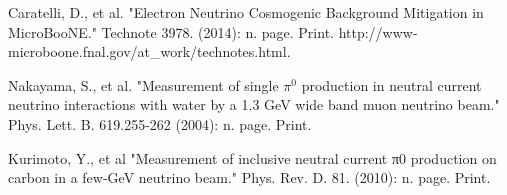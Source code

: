 \documentclass[12pt]{article}
\begin{document}
\begin{thebibliography}{20}
Caratelli, D., et al. "Electron Neutrino Cosmogenic Background Mitigation in MicroBooNE." Technote 3978. (2014): n. page. Print. http://www-microboone.fnal.gov/at\_work/technotes.html.

Nakayama, S., et al. "Measurement of single $\pi^0$ production in neutral current neutrino interactions with water by a 1.3 GeV wide band muon neutrino beam." Phys. Lett. B. 619.255-262 (2004): n. page. Print.

Kurimoto, Y., et al "Measurement of inclusive neutral current π0 production on carbon in a few-GeV neutrino beam." Phys. Rev. D. 81. (2010): n. page. Print.

\end{thebibliography}
\end{document}
